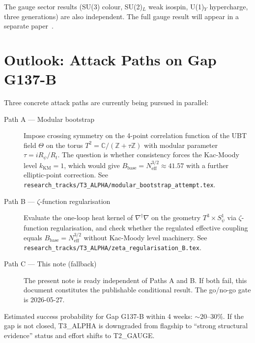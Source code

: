 \documentclass[12pt,a4paper]{article}
\theoremstyle{definition}
\theoremstyle{remark}
\newcommand{\CC}{\mathbb{C}}
\newcommand{\ZZ}{\mathbb{Z}}
\begin{document}
The gauge sector results (SU(3) colour, SU(2)$_L$ weak isospin, U(1)$_Y$
hypercharge, three generations) are also independent.  The full gauge
result will appear in a separate paper~\cite{jaros2026_gauge_forthcoming}.

\section{Outlook: Attack Paths on Gap G137-B}
\label{sec:outlook}

Three concrete attack paths are currently being pursued in parallel:

\begin{description}
  \item[Path A — Modular bootstrap] Impose crossing symmetry on the 4-point
        correlation function of the UBT field $\Theta$ on the torus
        $T^2 = \CC/(\ZZ + \tau\ZZ)$ with modular parameter $\tau = iR_\psi/R_t$.
        The question is whether consistency forces the Kac-Moody level
        $k_{\mathrm{KM}} = 1$, which would give $B_{\mathrm{base}} = N_{\mathrm{eff}}^{3/2}
        \approx 41.57$ with a further elliptic-point correction.
        See \texttt{research\_tracks/T3\_ALPHA/modular\_bootstrap\_attempt.tex}.

  \item[Path B — $\zeta$-function regularisation] Evaluate the one-loop heat
        kernel of $\nabla^\dagger\nabla$ on the geometry $T^3\times S^1_\psi$
        via $\zeta$-function regularisation, and check whether the regulated
        effective coupling equals $B_{\mathrm{base}} = N_{\mathrm{eff}}^{3/2}$
        without Kac-Moody level machinery.
        See \texttt{research\_tracks/T3\_ALPHA/zeta\_regularisation\_B.tex}.

  \item[Path C — This note (fallback)] The present note is ready independent
        of Paths A and B.  If both fail, this document constitutes the
        publishable conditional result.  The go/no-go gate is 2026-05-27.
\end{description}

Estimated success probability for Gap G137-B within 4 weeks: ${\sim}20$–$30\%$.
If the gap is not closed, T3\_ALPHA is downgraded from flagship to
``strong structural evidence'' status and effort shifts to T2\_GAUGE.
\end{document}

